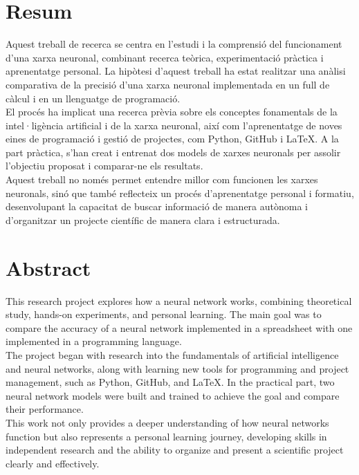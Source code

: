 %
%
\section*{Resum}
Aquest treball de recerca se centra en l’estudi i la comprensió del funcionament d’una xarxa neuronal, combinant recerca teòrica, experimentació pràctica i aprenentatge personal. La hipòtesi d’aquest treball ha estat realitzar una anàlisi comparativa de la precisió d’una xarxa neuronal implementada en un full de càlcul i en un llenguatge de programació.\\

El procés ha implicat una recerca prèvia sobre els conceptes fonamentals de la intel·ligència artificial i de la xarxa neuronal, així com l’aprenentatge de noves eines de programació i gestió de projectes, com Python, GitHub i LaTeX. A la part pràctica, s’han creat i entrenat dos models de xarxes neuronals per assolir l’objectiu proposat i comparar-ne els resultats.\\

Aquest treball no només permet entendre millor com funcionen les xarxes neuronals, sinó que també reflecteix un procés d’aprenentatge personal i formatiu, desenvolupant la capacitat de buscar informació de manera autònoma i d’organitzar un projecte científic de manera clara i estructurada.
%
%
\section*{Abstract}
This research project explores how a neural network works, combining theoretical study, hands-on experiments, and personal learning. The main goal was to compare the accuracy of a neural network implemented in a spreadsheet with one implemented in a programming language.\\

The project began with research into the fundamentals of artificial intelligence and neural networks, along with learning new tools for programming and project management, such as Python, GitHub, and LaTeX. In the practical part, two neural network models were built and trained to achieve the goal and compare their performance.\\

This work not only provides a deeper understanding of how neural networks function but also represents a personal learning journey, developing skills in independent research and the ability to organize and present a scientific project clearly and effectively.


